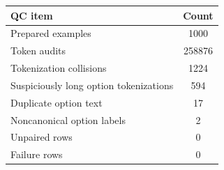 \begin{tabular}{@{}lc@{}}
\toprule
QC item & Count \\
\midrule
Prepared examples & 1000 \\
Token audits & 258876 \\
Tokenization collisions & 1224 \\
Suspiciously long option tokenizations & 594 \\
Duplicate option text & 17 \\
Noncanonical option labels & 2 \\
Unpaired rows & 0 \\
Failure rows & 0 \\
\bottomrule
\end{tabular}
